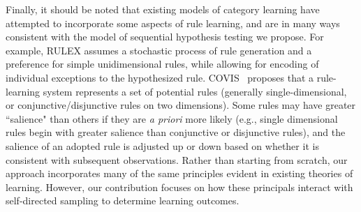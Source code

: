 \documentclass[3p,twocolumn,authoryear,10pt]{elsarticle}
\begin{document}
Finally, it should be noted that existing models of category learning have attempted to incorporate some aspects of rule learning, and are in many ways consistent with the model of sequential hypothesis testing we propose. For example, RULEX \citep{nosofsky1998rule} assumes a stochastic process of rule generation and a preference for simple unidimensional rules, while allowing for encoding of individual exceptions to the hypothesized rule. COVIS~\citep{Ashby:2010p14184} proposes that a rule-learning system represents a set of potential rules (generally single-dimensional, or conjunctive/disjunctive rules on two dimensions). Some rules may have greater ``salience" than others if they are \textit{a priori} more likely (e.g., single dimensional rules begin with greater salience than conjunctive or disjunctive rules), and the salience of an adopted rule is adjusted up or down based on whether it is consistent with subsequent observations. %
Rather than starting from scratch,  our approach incorporates many of the same principles evident in existing theories of learning.  However, our contribution focuses on how these principals interact with self-directed sampling to determine learning outcomes.




%

\end{document}
